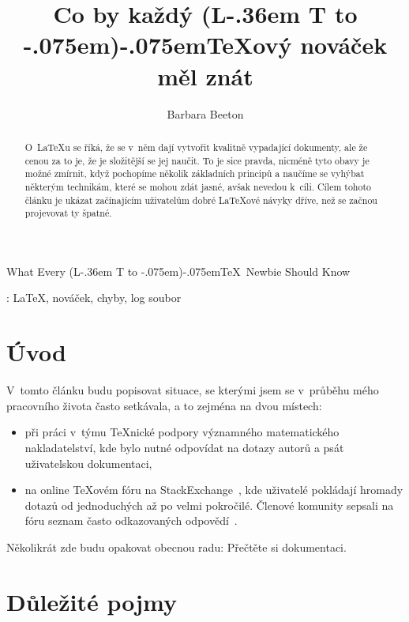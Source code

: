 \documentclass{csbulletin}
\makeatletter
\DeclareRobustCommand{\La}{L\kern-.36em%
        {\sbox\z@ T%
         \vbox to\ht\z@{\hbox{\check@mathfonts
                              \fontsize\sf@size\z@
                              \math@fontsfalse\selectfont
                              A}%
                        \vss}%
        }}
\def\AllTeX{(\La\kern-.075em)\kern-.075em\TeX}
\makeatother
\begin{document}
\title
  {Co by každý \AllTeX ový nováček měl znát}
\EnglishTitle
  {What Every \AllTeX\ Newbie Should Know}
\author{Barbara Beeton}

\maketitle[3pt]

\begin{abstract}
O~\LaTeX u se říká, že se v~něm dají vytvořit kvalitně vypadající dokumenty,
ale že cenou za to je, že je složitější se jej naučit.
To je sice pravda, nicméně tyto obavy je možné zmírnit, když pochopíme několik základních principů a naučíme se vyhýbat některým technikám, které se mohou zdát jasné, avšak nevedou k~cíli. Cílem tohoto článku je ukázat začínajícím uživatelům dobré \LaTeX ové návyky dříve, než se začnou projevovat ty špatné.
\end{abstract}
\klicovaslova: \LaTeX, nováček, chyby, log soubor

\makeatletter
\def\@thefnmark{}
\makeatother

\section{Úvod}

V~tomto článku budu popisovat situace, se kterými jsem se v~průběhu mého pracovního života často setkávala, a to zejména na dvou místech:
\begin{itemize}
\item při práci v~týmu \TeX nické podpory významného matematického nakladatelství, kde bylo nutné odpovídat na dotazy autorů a psát uživatelskou dokumentaci,
\item na online \TeX ovém fóru na StackExchange~\cite{TSE}, kde uživatelé pokládají hromady dotazů od jednoduchých až po velmi pokročilé. Členové komunity sepsali na fóru seznam často odkazovaných odpovědí~\cite{2419}.
\end{itemize}
Několikrát zde budu opakovat obecnou radu: Přečtěte si dokumentaci.

\section{Důležité pojmy}
\label{dupo}
\end{document}
